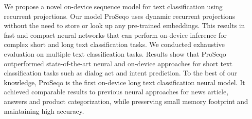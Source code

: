 We propose a novel on-device sequence model for text classification using recurrent projections. Our model ProSeqo uses dynamic recurrent projections without the need to store or look up any pre-trained embeddings. This results in fast and compact neural networks that can perform on-device inference for complex short and long text classification tasks. We conducted exhaustive evaluation on multiple text classification tasks. Results show that ProSeqo outperformed state-of-the-art neural and on-device approaches for short text classification tasks such as dialog act and intent prediction. To the best of our knowledge, ProSeqo is the first on-device long text classification neural model. It achieved comparable results to previous neural approaches for news article, answers and product categorization, while preserving small memory footprint and maintaining high accuracy.
